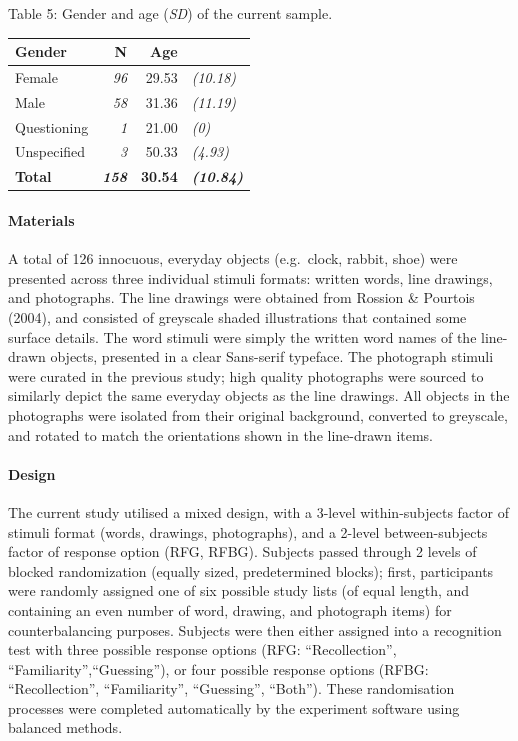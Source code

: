 \documentclass[
  11pt,
]{article}
\begin{document}
Table 5: Gender and age (\emph{SD}) of the current sample.

\begin{table}[!h]
\centering
\begin{tabular}{l>{}rr>{}l}
\toprule
Gender & N & Age &  \\
\midrule
Female & \em{96} & 29.53 & \em{(10.18)}\\
Male & \em{58} & 31.36 & \em{(11.19)}\\
Questioning & \em{1} & 21.00 & \em{(0)}\\
Unspecified & \em{3} & 50.33 & \em{(4.93)}\\
\textbf{Total} & \textbf{\em{158}} & \textbf{30.54} & \textbf{\em{(10.84)}}\\
\bottomrule
\end{tabular}
\end{table}

\hypertarget{materials-2}{%
\paragraph{Materials}\label{materials-2}}

A total of 126 innocuous, everyday objects (e.g.~clock, rabbit, shoe)
were presented across three individual stimuli formats: written words,
line drawings, and photographs. The line drawings were obtained from
Rossion \& Pourtois (2004), and consisted of greyscale shaded
illustrations that contained some surface details. The word stimuli were
simply the written word names of the line-drawn objects, presented in a
clear Sans-serif typeface. The photograph stimuli were curated in the
previous study; high quality photographs were sourced to similarly
depict the same everyday objects as the line drawings. All objects in
the photographs were isolated from their original background, converted
to greyscale, and rotated to match the orientations shown in the
line-drawn items.

\hypertarget{design-2}{%
\paragraph{Design}\label{design-2}}

The current study utilised a mixed design, with a 3-level
within-subjects factor of stimuli format (words, drawings, photographs),
and a 2-level between-subjects factor of response option (RFG, RFBG).
Subjects passed through 2 levels of blocked randomization (equally
sized, predetermined blocks); first, participants were randomly assigned
one of six possible study lists (of equal length, and containing an even
number of word, drawing, and photograph items) for counterbalancing
purposes. Subjects were then either assigned into a recognition test
with three possible response options (RFG: ``Recollection'',
``Familiarity'',``Guessing''), or four possible response options (RFBG:
``Recollection'', ``Familiarity'', ``Guessing'', ``Both''). These
randomisation processes were completed automatically by the experiment
software using balanced methods.
\end{document}
